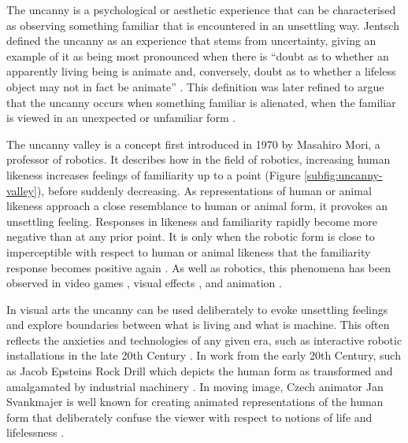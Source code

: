 The uncanny is a psychological or aesthetic experience that can be characterised as observing something familiar that is encountered in an unsettling way. 
Jentsch defined the uncanny as an experience that stems from uncertainty, giving an example of it as being most pronounced when there is “doubt as to whether an apparently living being is animate and, conversely, doubt as to whether a lifeless object may not in fact be animate” \citep{jentsch1997psychology}. 
This definition was later refined to argue that the uncanny occurs when something familiar is alienated, when the familiar is viewed in an unexpected or unfamiliar form \citep{freud1919uncanny}.

The uncanny valley is a concept first introduced in 1970 by Masahiro Mori, a professor of robotics. 
It describes how in the field of robotics, increasing human likeness increases feelings of familiarity up to a point (Figure \ref{subfig:uncanny-valley}), before suddenly decreasing. 
As representations of human or animal likeness approach a close resemblance to human or animal form, it provokes an unsettling feeling. 
Responses in likeness and familiarity rapidly become more negative than at any prior point. 
It is only when the robotic form is close to imperceptible with respect to human or animal likeness that the familiarity response becomes positive again \citep{mori1970uncanny}. 
As well as robotics, this phenomena has been observed in video games \citep{ratajczyk2019uncanny}, visual effects \citep{schwind2018avoiding}, and animation \citep{assaf2020presence}.

In visual arts the uncanny can be used deliberately to evoke unsettling feelings and explore boundaries between what is living and what is machine. This often reflects the anxieties and technologies of any given era, such as interactive robotic installations in the late 20th Century \citep{tronstad2008uncanny}. In work from the early 20th Century, such as Jacob Epsteins Rock Drill which depicts the human form as transformed and amalgamated by industrial machinery \citep{grenville2001uncanny}. In moving image, Czech animator Jan Svankmajer is well known for creating animated representations of the human form that deliberately confuse the viewer with respect to notions of life and lifelessness \citep{chryssouli2019alchemist}.

